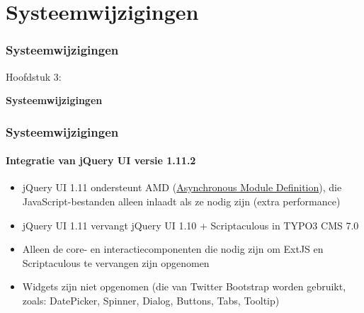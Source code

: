 %

\section{Systeemwijzigingen}
\begin{frame}[fragile]
	\frametitle{Systeemwijzigingen}

	\begin{center}\huge{Hoofdstuk 3:}\end{center}
	\begin{center}\huge{\color{typo3darkgrey}\textbf{Systeemwijzigingen}}\end{center}

\end{frame}


\begin{frame}[fragile]
	\frametitle{Systeemwijzigingen}
	\framesubtitle{Integratie van jQuery UI versie 1.11.2}

	\begin{itemize}
		\item jQuery UI 1.11 ondersteunt AMD
			(\href{http://en.wikipedia.org/wiki/Asynchronous_module_definition}{Asynchronous Module Definition}),
			die JavaScript-bestanden alleen inlaadt als ze nodig zijn (extra performance)

    	\item jQuery UI 1.11 vervangt jQuery UI 1.10 + Scriptaculous in TYPO3 CMS 7.0

    	\item Alleen de core- en interactiecomponenten die nodig zijn
    		om ExtJS en Scriptaculous te vervangen zijn opgenomen 

    	\item Widgets zijn niet opgenomen (die van Twitter Bootstrap worden gebruikt,
    		zoals: DatePicker, Spinner, Dialog, Buttons, Tabs, Tooltip)

	\end{itemize}

\end{frame}

